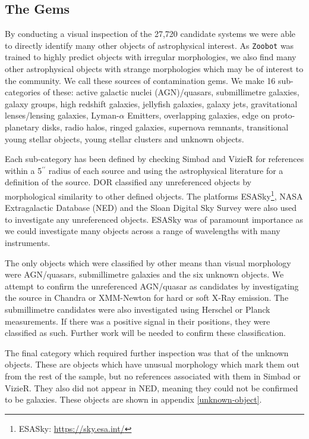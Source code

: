 {\vspace{-8mm}

\subsection{The Gems}\label{gems}
\noindent By conducting a visual inspection of the 27,720 candidate systems we were able to directly identify many other objects of astrophysical interest. As \texttt{Zoobot} was trained to highly predict objects with irregular morphologies, we also find many other astrophysical objects with strange morphologies which may be of interest to the community. We call these sources of contamination gems. We make 16 sub-categories of these: active galactic nuclei (AGN)/quasars, submillimetre galaxies, galaxy groups, high redshift galaxies, jellyfish galaxies, galaxy jets, gravitational lenses/lensing galaxies, Lyman-$\alpha$ Emitters, overlapping galaxies, edge on proto-planetary disks, radio halos, ringed galaxies, supernova remnants, transitional young stellar objects, young stellar clusters and unknown objects. 

Each sub-category has been defined by checking Simbad and VizieR for references within a 5$^{\prime \prime}$ radius of each source and using the astrophysical literature for a definition of the source. DOR classified any unreferenced objects by morphological similarity to other defined objects. The platforms ESASky\footnote{ESASky: \url{https://sky.esa.int/}}\citep{2017arXiv171204114M}, NASA Extragalactic Database (NED) and the Sloan Digital Sky Survey were also used to investigate any unreferenced objects. ESASky was of paramount importance as we could investigate many objects across a range of wavelengths with many instruments. 

The only objects which were classified by other means than visual morphology were AGN/quasars, submillimetre galaxies and the six unknown objects. We attempt to confirm the unreferenced AGN/quasar as candidates by investigating the source in Chandra or XMM-Newton for hard or soft X-Ray emission. The submillimetre candidates were also investigated using Herschel or Planck measurements. If there was a positive signal in their positions, they were classified as such. Further work will be needed to confirm these classification.

The final category which required further inspection was that of the unknown objects. These are objects which have unusual morphology which mark them out from the rest of the sample, but no references associated with them in Simbad or VizieR. They also did not appear in NED, meaning they could not be confirmed to be galaxies. These objects are shown in appendix \ref{unknown-object}.

}
